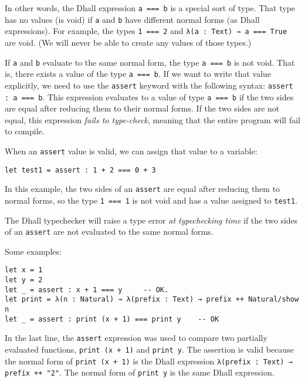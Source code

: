 In other words, the Dhall expression \lstinline!a === b! is a special sort of type.
That type has no values (is void) if \lstinline!a! and \lstinline!b! have different normal forms (as Dhall expressions).
For example, the types \lstinline!1 === 2! and \lstinline!λ(a : Text) → a === True! are void.
(We will never be able to create any values of those types.) 


If \lstinline!a! and \lstinline!b! evaluate to the same normal form, the type \lstinline!a === b! is not void.
That is, there exists a value of the type \lstinline!a === b!.
If we want to write that value explicitly, we need to use the \lstinline!assert! keyword with the following syntax: \lstinline!assert : a === b!.
This expression evaluates to a value of type \lstinline!a === b! if the two sides are equal after reducing them to their normal forms.
If the two sides are not equal, this expression \emph{fails to type-check}, meaning that the entire program will fail to compile.


When an \lstinline!assert! value is valid, we can assign that value to a variable:


\begin{lstlisting}[language=Dhall]
let test1 = assert : 1 + 2 === 0 + 3
\end{lstlisting}


In this example, the two sides of an \lstinline!assert! are equal after reducing them to normal forms, so the type \lstinline!1 === 1! is not void and has a value assigned to \lstinline!test1!.


The Dhall typechecker will raise a type error \emph{at typechecking time} if the two sides of an \lstinline!assert! are not evaluated to the same normal forms.


Some examples:


\begin{lstlisting}[language=Dhall]
let x = 1
let y = 2
let _ = assert : x + 1 === y     -- OK.
let print = λ(n : Natural) → λ(prefix : Text) → prefix ++ Natural/show n
let _ = assert : print (x + 1) === print y    -- OK
\end{lstlisting}


In the last line, the \lstinline!assert! expression was used to compare two partially evaluated functions, \lstinline!print (x + 1)! and \lstinline!print y!.
The assertion is valid because the normal form of \lstinline!print (x + 1)! is the Dhall expression \lstinline!λ(prefix : Text) → prefix ++ "2"!.
The normal form of \lstinline!print y! is the same Dhall expression.


